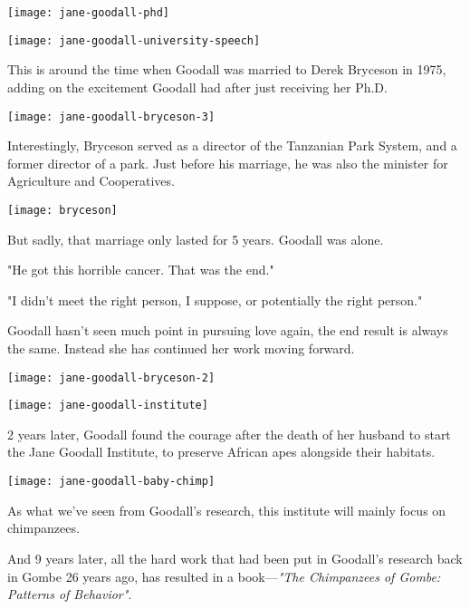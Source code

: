 \documentclass[12pt]{report}
\begin{document}
\texttt{[image: jane-goodall-phd]}

\texttt{[image: jane-goodall-university-speech]}

\pagebreak

This is around the time when Goodall was married to Derek Bryceson in 1975,
adding on the excitement Goodall had after just receiving her Ph.D.

\texttt{[image: jane-goodall-bryceson-3]}

Interestingly, Bryceson served as a director of the Tanzanian Park System, and
a former director of a park. Just before his marriage, he was also the minister
for Agriculture and Cooperatives.

\texttt{[image: bryceson]}

\pagebreak

But sadly, that marriage only lasted for 5 years. Goodall was alone.

"He got this horrible cancer. That was the end."

"I didn't meet the right person, I suppose, or potentially the right person."

Goodall hasn't seen much point in pursuing love again, the end result is always
the same. Instead she has continued her work moving forward.

\texttt{[image: jane-goodall-bryceson-2]}

\pagebreak

\texttt{[image: jane-goodall-institute]}

2 years later, Goodall found the courage after the death of her husband to
start the Jane Goodall Institute, to preserve African apes alongside their
habitats.

\texttt{[image: jane-goodall-baby-chimp]}

As what we've seen from Goodall's research, this institute will mainly focus on
chimpanzees.

\pagebreak

And 9 years later, all the hard work that had been put in Goodall's research
back in Gombe 26 years ago, has resulted in a book---\textit{"The Chimpanzees
of Gombe: Patterns of Behavior"}.
\end{document}
